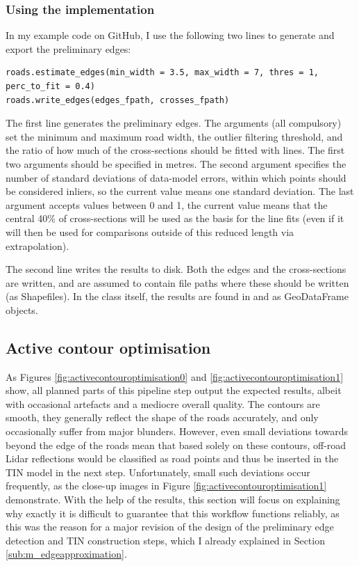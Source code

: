 \subsubsection{Using the implementation}

In my example code on GitHub, I use the following two lines to generate and export the preliminary edges:

\begin{lstlisting}
roads.estimate_edges(min_width = 3.5, max_width = 7, thres = 1, perc_to_fit = 0.4)
roads.write_edges(edges_fpath, crosses_fpath)
\end{lstlisting}

The first line generates the preliminary edges. The arguments (all compulsory) set the minimum and maximum road width, the outlier filtering threshold, and the ratio of how much of the cross-sections should be fitted with lines. The first two arguments should be specified in metres. The second argument specifies the number of standard deviations of data-model errors, within which points should be considered inliers, so the current value means one standard deviation. The last argument accepts values between 0 and 1, the current value means that the central 40\% of cross-sections will be used as the basis for the line fits (even if it will then be used for comparisons outside of this reduced length via extrapolation).

The second line writes the results to disk. Both the edges and the cross-sections are written,  and  are assumed to contain file paths where these should be written (as Shapefiles). In the class itself, the results are found in  and  as GeoDataFrame objects.

\subsection{Active contour optimisation}
\label{sub:r_activecontours}

As Figures \ref{fig:activecontouroptimisation0} and \ref{fig:activecontouroptimisation1} show, all planned parts of this pipeline step output the expected results, albeit with occasional artefacts and a mediocre overall quality. The contours are smooth, they generally reflect the shape of the roads accurately, and only occasionally suffer from major blunders. However, even small deviations towards beyond the edge of the roads mean that based solely on these contours, off-road Lidar reflections would be classified as road points and thus be inserted in the TIN model in the next step. Unfortunately, small such deviations occur frequently, as the close-up images in Figure \ref{fig:activecontouroptimisation1} demonstrate. With the help of the results, this section will focus on explaining why exactly it is difficult to guarantee that this workflow functions reliably, as this was the reason for a major revision of the design of the preliminary edge detection and TIN construction steps, which I already explained in Section \ref{sub:m_edgeapproximation}.

